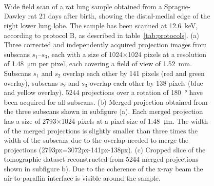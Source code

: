 \ifiucr
	\begin{figure}%
			\caption{Wide field scan of a rat lung sample obtained from a Sprague-Dawley rat 21 days after birth, showing the distal-medial edge of the right lower lung lobe. The sample has been scanned at \SI{12.6}{\kilo\electronvolt}, according to protocol B, as described in table~\ref{tab:protocols}. %
		(a) Three corrected and independently acquired projection images from subscans $s_1$--$s_3$, each with a size of 1024\(\times\)1024 pixels at a resolution of \SI{1.48}{\micro\meter} per pixel, each covering a field of view of \SI{1.52}{\milli\meter}. Subscans $s_1$ and $s_2$ overlap each other by 141 pixels (red and green overlay), subscans $s_2$ and $s_3$ overlap each other by 138 pixels (blue and yellow overlay). 5244 projections over a rotation of \SI{180}{\degree} have been acquired for all subscans. %
		(b) Merged projection obtained from the three subscans shown in subfigure (a). Each merged projection has a size of 2793\(\times\)1024 pixels at a pixel size of \SI{1.48}{\micro\meter}. The width of the merged projections is slightly smaller than three times the width of the subscans due to the overlap needed to merge the projections (2793px=3072px-141px-138px). %
		(c) Cropped slice of the tomographic dataset reconstructed from 5244 merged projections shown in subfigure b). Due to the coherence of the x-ray beam the air-to-paraffin interface is visible around the sample.%
		}%
		\label{fig:wide field scan results}%
		\\%
		\\%
		\\%
	\end{figure}%
\else

